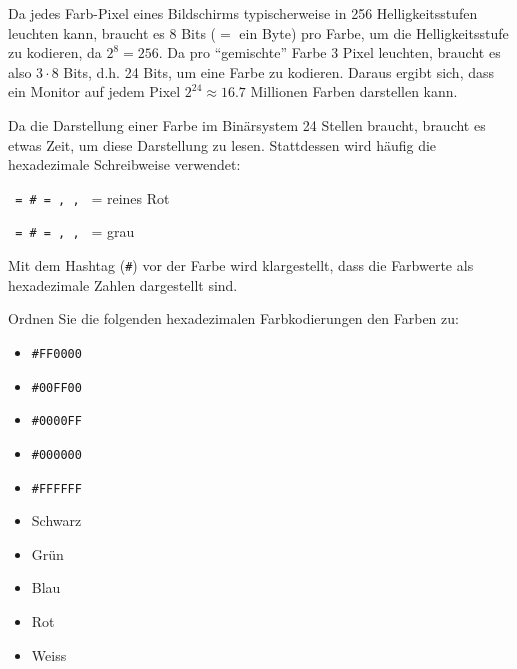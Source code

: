 \begin{myexample}
Da jedes Farb-Pixel eines Bildschirms typischerweise in 256 Helligkeitsstufen leuchten kann, braucht es 8 Bits ($=$ ein Byte) pro Farbe, um die Helligkeitsstufe zu kodieren, da $2^8=256$. Da pro \enquote{gemischte} Farbe 3 Pixel leuchten, braucht es also $3\cdot 8$ Bits, d.h. 24 Bits, um eine Farbe zu kodieren. Daraus ergibt sich, dass ein Monitor auf jedem Pixel $2^{24} \approx 16.7$ Millionen Farben darstellen kann.
\end{myexample}

\begin{myexample}
Da die Darstellung einer Farbe im Binärsystem 24 Stellen braucht, braucht es etwas Zeit, um diese Darstellung zu lesen. Stattdessen wird häufig die hexadezimale Schreibweise verwendet:

\texttt{ = \# = , , } = reines Rot

\texttt{ = \# = , , } = grau

Mit dem Hashtag (\texttt{\#}) vor der Farbe wird klargestellt, dass die Farbwerte als hexadezimale Zahlen dargestellt sind.
\end{myexample}

\begin{myexercise}
	Ordnen Sie die folgenden hexadezimalen Farbkodierungen den Farben zu:

	\begin{minipage}[c]{.2\textwidth}
		\begin{itemize}
			\item \texttt{\#FF0000}
			\item \texttt{\#00FF00}
			\item \texttt{\#0000FF}
			\item \texttt{\#000000}
			\item \texttt{\#FFFFFF}
		\end{itemize}
	\end{minipage}
	\begin{minipage}[c]{.2\textwidth}
		\begin{itemize}
			\item Schwarz
			\item Grün
			\item Blau
			\item Rot
			\item Weiss
		\end{itemize}
	\end{minipage}
\end{myexercise}

